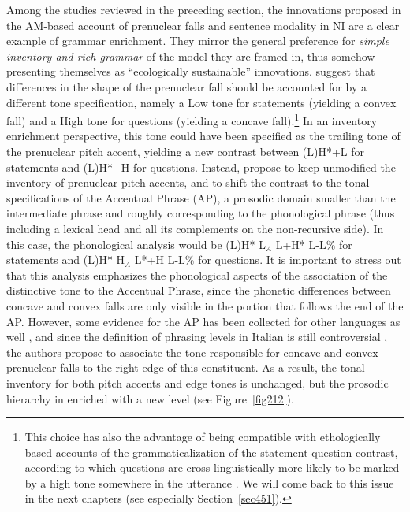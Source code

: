 Among the studies reviewed in the preceding section, the innovations proposed in the AM-based account of prenuclear falls and sentence modality in NI \citep{petrone2008tonal} are a clear example of grammar enrichment. They mirror the general preference for \textit{simple inventory and rich grammar} of the model they are framed in, thus somehow presenting themselves as ``ecologically sustainable'' innovations. \citeauthor{petrone2008tonal} suggest that differences in the shape of the prenuclear fall should be accounted for by a different tone specification, namely a Low tone for statements (yielding a convex fall) and a High tone for questions (yielding a concave fall).\footnote{This choice has also the advantage of being compatible with ethologically based accounts of the grammaticalization of the statement-question contrast, according to which questions are cross-linguistically more likely to be marked by a high tone somewhere in the utterance \citep{ohala1983cross,gussenhoven2004phonology}. We will come back to this issue in the next chapters (see especially Section~\ref{sec451}).} In an inventory enrichment perspective, this tone could have been specified as the trailing tone of the prenuclear pitch accent, yielding a new contrast between (L)H*+L for statements and (L)H*+H for questions. Instead, \citeauthor{petrone2008tonal} propose to keep unmodified the inventory of prenuclear pitch accents, and to shift the contrast to the tonal specifications of the Accentual Phrase (AP), a prosodic domain smaller than the intermediate phrase and roughly corresponding to the phonological phrase (thus including a lexical head and all its complements on the non-recursive side). In this case, the phonological analysis would be (L)H* L$_{A}$ L+H* L-L\% for statements and (L)H* H$_{A}$ L*+H L-L\% for questions. It is important to stress out that this analysis emphasizes the phonological aspects of the association of the distinctive tone to the Accentual Phrase, since the phonetic differences between concave and convex falls are only visible in the portion that follows the end of the AP. However, some evidence for the AP has been collected for other languages as well \citep{jun1993phonetics,michelas2011caracterisation}, and since the definition of phrasing levels in Italian is still controversial \citep{dimperio2003levels}, the authors propose to associate the tone responsible for concave and convex prenuclear falls to the right edge of this constituent. As a result, the tonal inventory for both pitch accents and edge tones is unchanged, but the prosodic hierarchy in enriched with a new level (see Figure~\ref{fig212}).

